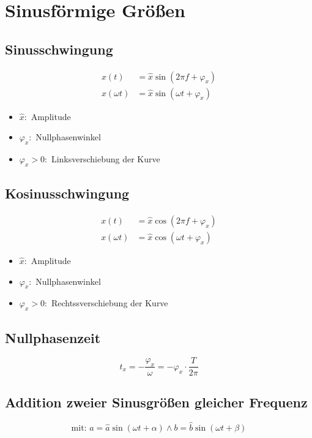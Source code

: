\section{Sinusförmige Größen}
\begin{multicols}{2}{}
 \subsection*{Sinusschwingung}
  \begin{align*}
   x\left(t\right) &= \hat{x} \sin\left( 2 \pi f + \varphi_x\right) \\
   x\left( \omega t \right) &= \hat{x} \sin\left( \omega t + \varphi_x\right)
  \end{align*}
  \begin{itemize}
   \item \(\hat{x} :\) Amplitude
   \item \(\varphi_x :\) Nullphasenwinkel
   \item \(\varphi_{x}>0 :\) Linksverschiebung der Kurve
  \end{itemize}

 \subsection*{Kosinusschwingung}
  \begin{align*}
   x\left(t\right) &= \hat{x} \cos\left( 2 \pi f + \varphi_x\right) \\
   x\left( \omega t \right) &= \hat{x} \cos\left( \omega t + \varphi_x\right)
  \end{align*}
  \begin{itemize}
   \item \(\hat{x} :\) Amplitude
   \item \(\varphi_x :\) Nullphasenwinkel
   \item \(\varphi_{x}>0 :\) Rechtssverschiebung der Kurve
  \end{itemize}
\end{multicols}

\subsection*{Nullphasenzeit}
\[ t_{x} = -\frac{\varphi_x}{\omega} = -\varphi_x \cdot \frac{T}{2 \pi} \]

\subsection*{Addition zweier Sinusgrößen gleicher Frequenz}
\[\text{mit: } a = \hat{a} \sin \left( \omega t + \alpha \right) \wedge b = \hat{b} \sin \left( \omega t + \beta \right)\]

